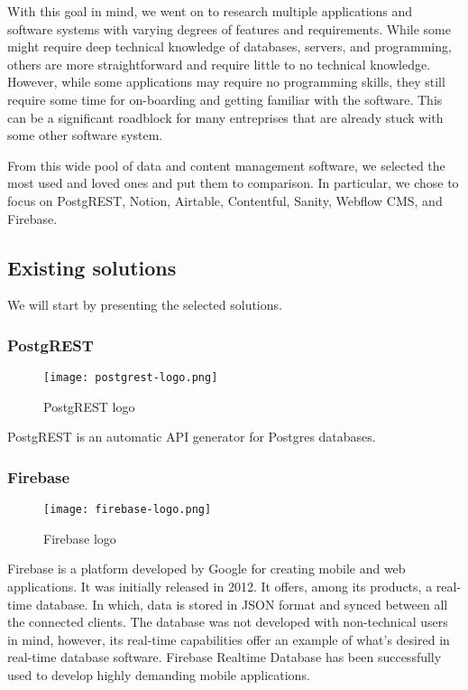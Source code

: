 With this goal in mind, we went on to research multiple applications and software systems with varying degrees of features and requirements.
While some might require deep technical knowledge of databases, servers, and programming, others are more straightforward and require little to no technical knowledge.
However, while some applications may require no programming skills, they still require some time for on-boarding and getting familiar with the software.
This can be a significant roadblock for many entreprises that are already stuck with some other software system.

From this wide pool of data and content management software, we selected the most used and loved ones and put them to comparison. In particular, we chose to focus on PostgREST, Notion, Airtable, Contentful, Sanity, Webflow CMS, and Firebase.

\subsection{Existing solutions}

We will start by presenting the selected solutions.

\subsubsection{PostgREST}

\begin{figure}[h]
	\centering
	\texttt{[image: postgrest-logo.png]}
	\caption{PostgREST logo}
\end{figure}

PostgREST is an automatic API generator for Postgres databases.


\subsubsection{Firebase}

\begin{figure}[h]
	\centering
	\texttt{[image: firebase-logo.png]}
	\caption{Firebase logo}
\end{figure}

Firebase is a platform developed by Google for creating mobile and web
applications. It was initially released in 2012. It offers, among its
products, a real-time database. In which, data is stored in JSON format
and synced between all the connected clients. The database was not
developed with non-technical users in mind, however, its real-time
capabilities offer an example of what's desired in real-time database
software. Firebase Realtime Database has been successfully used to
develop highly demanding mobile applications.

